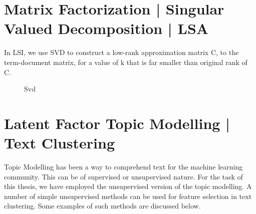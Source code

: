 \section{Matrix Factorization | Singular Valued Decomposition | LSA }

In LSI, we use SVD to construct a low-rank approximation matrix C, to the term-document matrix, for a value of k that is far smaller than original rank of C. 





\begin{figure}[H]
    {\par}
    \caption{Svd}
\end{figure}








\section{Latent Factor Topic Modelling | Text Clustering}

Topic Modelling has been a way to comprehend text for the machine learning community. This can be of supervised or unsupervised nature. For the task of this thesis, we have employed the unsupervised version of the topic modelling. A number of simple unsupervised methods can be used for feature selection in text clustering. Some examples of such methods are discussed below.

